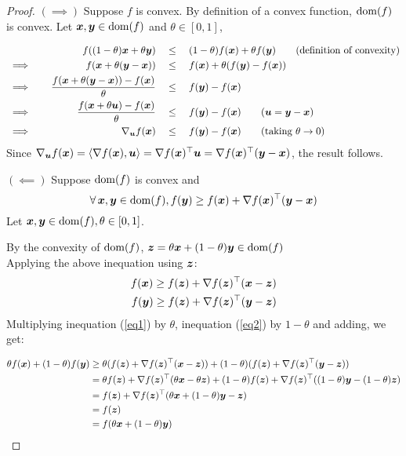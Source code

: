 \documentclass{article}
\begin{document}
\begin{proof}
$(\implies)$ Suppose $f$ is convex. By definition of a convex function, $\operatorname{dom}(f)$ is convex. Let ${\bm{x}}, {\bm{y}} \in \operatorname{dom}(f)$ and $\theta\in[0,1]$,

\begin{align*}
	&& f((1-\theta)\vx+ \theta \vy) \quad &\leq \quad (1-\theta) f(\vx) + \theta f(\vy) \tag{definition of convexity}\\
	&\implies \quad &f(\vx+\theta (\vy-\vx)) \quad &\leq \quad f(\vx) + \theta (f(\vy)-f(\vx))\\
	&\implies \quad  &\frac{f(\vx+\theta (\vy-\vx)) - f(\vx)}{\theta} \quad &\leq \quad f(\vy)-f(\vx)\\
	&\implies \quad &\frac{f(\vx+\theta \vu) - f(\vx)}{\theta} \quad  &\leq \quad f(\vy)-f(\vx) \tag{$\vu=\vy-\vx$}\\
	&\implies \quad &\nabla_\vu f(\vx) \quad & \leq \quad f(\vy)-f(\vx) \tag{taking $\theta\to 0$}
\end{align*}{}
Since $\nabla_{\bm{u}} f({\bm{x}}) = \left\langle\nabla f({\bm{x}}), {\bm{u}}\right\rangle = \nabla f({\bm{x}})^\top {\bm{u}} = \nabla f({\bm{x}})^\top ({\bm{y}}-{\bm{x}})$, the result follows.

$(\impliedby)$
Suppose $\operatorname{dom}(f)$ is convex and
\[
\forall \vx, \vy \in \dom(f), f(\vy) \geq f(\vx) + \nabla f(\vx)^\top(\vy-\vx)
\]
Let ${\bm{x}},{\bm{y}}\in\operatorname{dom}(f), \theta \in [0,1]$.

By the convexity of $\operatorname{dom}(f)$, ${\bm{z}} = \theta {\bm{x}} + (1-\theta){\bm{y}} \in \operatorname{dom}(f)$\\

Applying the above inequation using ${\bm{z}}$: 
\begin{align}
    f({\bm{x}}) \geq f({\bm{z}}) + \nabla f({\bm{z}})^\top({\bm{x}}-{\bm{z}}) \label{eq1}\\
    f({\bm{y}}) \geq f({\bm{z}}) + \nabla f({\bm{z}})^\top({\bm{y}}-{\bm{z}}) \label{eq2}
\end{align}{}
Multiplying inequation (\ref{eq1}) by $\theta$, inequation (\ref{eq2}) by $1-\theta$ and adding, we get:

\begin{align*}
    \theta f({\bm{x}}) + (1-\theta) f({\bm{y}}) &\geq \theta(f({\bm{z}}) + \nabla f({\bm{z}})^\top({\bm{x}}-{\bm{z}}))+(1-\theta)(f({\bm{z}}) + \nabla f({\bm{z}})^\top({\bm{y}}-{\bm{z}}))\\
    &= \theta f({\bm{z}})+ \nabla f({\bm{z}})^\top (\theta {\bm{x}} - \theta {\bm{z}}) +  (1-\theta) f({\bm{z}})+ \nabla f({\bm{z}})^\top ((1-\theta) {\bm{y}} - (1-\theta) {\bm{z}})\\
    &= f({\bm{z}})+ \nabla f({\bm{z}})^\top (\theta {\bm{x}} + (1-\theta){\bm{y}} - {\bm{z}})\\
    &=f({\bm{z}})\\
    &=f(\theta {\bm{x}} + (1-\theta){\bm{y}})
\end{align*}{}
\end{proof}{}
\end{document}
